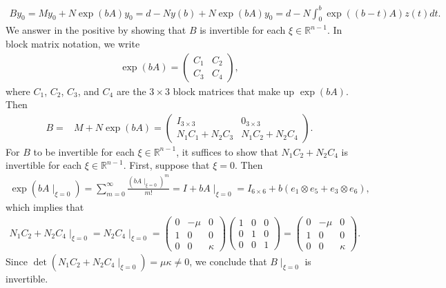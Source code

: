 \documentclass[11pt,letterpaper,reqno]{amsart}
\numberwithin{equation}{section}
\begin{document}
\begin{align}
    By_{0}=My_{0}+N\exp(bA)y_{0}=d-Ny(b)+N\exp(bA)y_{0}=d-N\int_{0}^{b}\exp((b-t)A)z(t)dt.
\end{align}
We answer in the positive by showing that \(B\) is invertible for each \(\xi \in \mathbb{R}^{n-1}\). In block matrix notation, we write
\begin{align}
    \exp(bA)=
    \begin{pmatrix}
        C_{1} & C_{2} \\
        C_{3} & C_{4}
    \end{pmatrix}
    ,
\end{align}
where \(C_{1}\), \(C_{2}\), \(C_{3}\), and \(C_{4}\) are the \(3 \times 3\) block matrices that make up \(\exp(bA)\). Then
\begin{align}
    B=&M+N\exp(bA)=
    \begin{pmatrix}
        I_{3 \times 3} & 0_{3 \times 3} \\
        N_{1}C_{1}+N_{2}C_{3} & N_{1}C_{2}+N_{2}C_{4}
    \end{pmatrix}
    .
\end{align}
For \(B\) to be invertible for each \(\xi \in \mathbb{R}^{n-1}\), it suffices to show that \(N_{1}C_{2}+N_{2}C_{4}\) is invertible for each \(\xi \in \mathbb{R}^{n-1}\). First, suppose that \(\xi = 0\). Then
\begin{align}
    \exp(bA\mid_{\xi = 0 })=\sum_{m=0}^{\infty}\frac{(bA\mid_{\xi = 0})^{m}}{m!}=I+bA\mid_{\xi = 0}= I_{6 \times 6} + b(e_1 \otimes e_5 + e_3 \otimes e_6 ),
\end{align}
which implies that
\begin{align}
    N_{1}C_{2}+N_{2}C_{4}\mid_{\xi = 0}=N_{2}C_{4}\mid_{\xi = 0}=
    \begin{pmatrix}
        0 & -\mu & 0 \\
        1 & 0 & 0 \\
        0 & 0 & \kappa
    \end{pmatrix}
    \begin{pmatrix}
        1 & 0 & 0 \\
        0 & 1 & 0 \\
        0 & 0 & 1
    \end{pmatrix}
    =
    \begin{pmatrix}
        0 & -\mu & 0 \\
        1 & 0 & 0 \\
        0 & 0 & \kappa
    \end{pmatrix}
    .
\end{align}
Since \(\det(N_{1}C_{2}+N_{2}C_{4}\mid_{\xi = 0})=\mu\kappa \neq 0\), we conclude that \(B\mid_{\xi = 0}\) is invertible.
\end{document}
